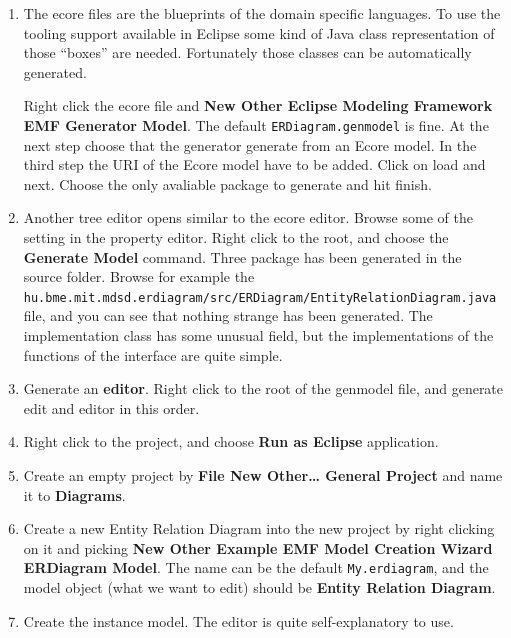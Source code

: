\documentclass[]{report}
\begin{document}
\begin{enumerate}
\def\labelenumi{\arabic{enumi}.}
\item
  The ecore files are the blueprints of the domain specific languages.
  To use the tooling support available in Eclipse some kind of Java
  class representation of those ``boxes'' are needed. Fortunately those
  classes can be automatically generated.

  Right click the ecore file and \textbf{New \textbar{} Other \textbar{}
  Eclipse Modeling Framework \textbar{} EMF Generator Model}. The
  default \texttt{ERDiagram.genmodel} is fine. At the next step choose
  that the generator generate from an Ecore model. In the third step the
  URI of the Ecore model have to be added. Click on load and next.
  Choose the only avaliable package to generate and hit finish.
\item
  Another tree editor opens similar to the ecore editor. Browse some of
  the setting in the property editor. Right click to the root, and
  choose the \textbf{Generate Model} command. Three package has been
  generated in the source folder. Browse for example the
  \texttt{hu.bme.mit.mdsd.erdiagram/src/ERDiagram/EntityRelationDiagram.java}
  file, and you can see that nothing strange has been generated. The
  implementation class has some unusual field, but the implementations
  of the functions of the interface are quite simple.
\item
  Generate an \textbf{editor}. Right click to the root of the genmodel
  file, and generate edit and editor in this order.
\item
  Right click to the project, and choose \textbf{Run as \textbar{}
  Eclipse} application.
\item
  Create an empty project by \textbf{File \textbar{} New \textbar{}
  Other\ldots{} \textbar{} General \textbar{} Project} and name it to
  \textbf{Diagrams}.
\item
  Create a new Entity Relation Diagram into the new project by right
  clicking on it and picking \textbf{New \textbar{} Other \textbar{}
  Example EMF Model Creation Wizard \textbar{} ERDiagram Model}. The
  name can be the default \texttt{My.erdiagram}, and the model object
  (what we want to edit) should be \textbf{Entity Relation Diagram}.
\item
  Create the instance model. The editor is quite self-explanatory to
  use.
\end{enumerate}
\end{document}
